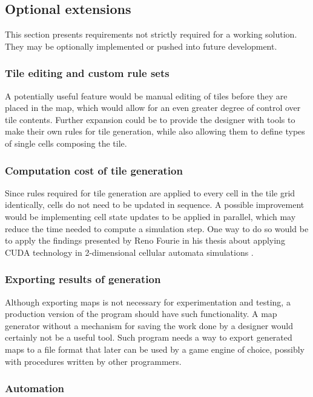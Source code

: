 \documentclass[12pt]{report}
\begin{document}
 
\subsection{Optional extensions}

This section presents requirements not strictly required for a working solution. They may be optionally implemented or pushed into future development.

\subsubsection{Tile editing and custom rule sets}

A potentially useful feature would be manual editing of tiles before they are placed in the map, which would allow for an even greater degree of control over tile contents. Further expansion could be to provide the designer with tools to make their own rules for tile generation, while also allowing them to define types of single cells composing the tile.

\subsubsection{Computation cost of tile generation}

Since rules required for tile generation are applied to every cell in the tile grid identically, cells do not need to be updated in sequence. A possible improvement would be implementing cell state updates to be applied in parallel, which may reduce the time needed to compute a simulation step. One way to do so would be to apply the findings presented by Reno Fourie in his thesis about applying CUDA technology in 2-dimensional cellular automata simulations \autocite{fourie2015parallel}.  

\subsubsection{Exporting results of generation}

Although exporting maps is not necessary for experimentation and testing, a production version of the program should have such functionality. A map generator without a mechanism for saving the work done by a designer would certainly not be a useful tool. Such program needs a way to export generated maps to a file format that later can be used by a game engine of choice, possibly with procedures written by other programmers. 

\subsubsection{Automation}
\end{document}
